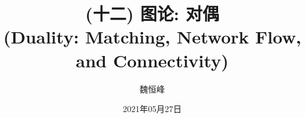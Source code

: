 \documentclass[]{beamer}
\title[(十二) 图论: 对偶]{(十二) 图论: 对偶
  \\(Duality: Matching, Network Flow, and Connectivity)}
\author[魏恒峰]{\large 魏恒峰}
\institute{hfwei@nju.edu.cn}
\date{2021年05月27日}
\begin{document}
\maketitle



\thankyou{}

\end{document}
